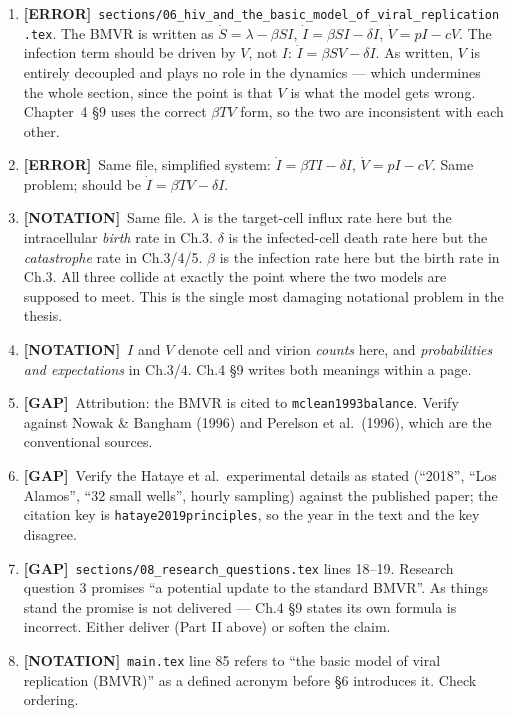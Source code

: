 \documentclass[11pt]{article}
\theoremstyle{plain}
\theoremstyle{definition}
\theoremstyle{remark}
\newcommand{\ERR}{\textcolor{red!70!black}{\textbf{[ERROR]}}}
\newcommand{\GAP}{\textcolor{orange!80!black}{\textbf{[GAP]}}}
\newcommand{\NOT}{\textcolor{blue!60!black}{\textbf{[NOTATION]}}}
\begin{document}
\begin{enumerate}[leftmargin=2.2em,label=\textbf{1.\arabic*}]
\item \ERR\ \texttt{sections/06\_hiv\_and\_the\_basic\_model\_of\_viral\_replication.tex}.
The BMVR is written as
$\dot S=\lambda-\beta SI$, $\dot I=\beta SI-\delta I$, $\dot V=pI-cV$.
The infection term should be driven by $V$, not $I$: $\dot I=\beta SV-\delta I$.
As written, $V$ is entirely decoupled and plays no role in the dynamics --- which
undermines the whole section, since the point is that $V$ is what the model gets wrong.
Chapter~4 \S9 uses the correct $\beta TV$ form, so the two are inconsistent with each
other.

\item \ERR\ Same file, simplified system: $\dot I=\beta TI-\delta I$, $\dot V=pI-cV$.
Same problem; should be $\dot I=\beta TV-\delta I$.

\item \NOT\ Same file. $\lambda$ is the target-cell influx rate here but the
intracellular \emph{birth} rate in Ch.3. $\delta$ is the infected-cell death rate here
but the \emph{catastrophe} rate in Ch.3/4/5. $\beta$ is the infection rate here but the
birth rate in Ch.3. All three collide at exactly the point where the two models are
supposed to meet. This is the single most damaging notational problem in the thesis.

\item \NOT\ $I$ and $V$ denote cell and virion \emph{counts} here, and \emph{probabilities
and expectations} in Ch.3/4. Ch.4 \S9 writes both meanings within a page.

\item \GAP\ Attribution: the BMVR is cited to \texttt{mclean1993balance}. Verify against
Nowak \& Bangham (1996) and Perelson et al.\ (1996), which are the conventional sources.

\item \GAP\ Verify the Hataye et al.\ experimental details as stated (``2018'',
``Los Alamos'', ``32 small wells'', hourly sampling) against the published paper; the
citation key is \texttt{hataye2019principles}, so the year in the text and the key
disagree.

\item \GAP\ \texttt{sections/08\_research\_questions.tex} lines 18--19. Research question
3 promises ``a potential update to the standard BMVR''. As things stand the promise is
not delivered --- Ch.4 \S9 states its own formula is incorrect. Either deliver
(Part II above) or soften the claim.

\item \NOT\ \texttt{main.tex} line 85 refers to ``the basic model of viral replication
(BMVR)'' as a defined acronym before \S6 introduces it. Check ordering.
\end{enumerate}
\end{document}
